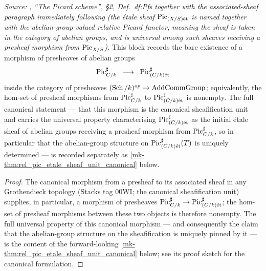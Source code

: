 \begin{theorem}\label{mk-thm:rel_pic_etale_sheaf_group_structure}
  \leanok

  \textit{Source: \cite{kleiman-picard}, ``The Picard scheme'', \S 2,
  Def.~df:Pfs together with the associated-sheaf paragraph immediately
  following (the \'etale sheaf \(\operatorname{Pic}_{(X/S)\mathrm{\acute{e}t}}\) is named together with the
  abelian-group-valued relative Picard functor, meaning the sheaf is taken in
  the category of abelian groups, and is universal among such sheaves
  receiving a presheaf morphism from \(\operatorname{Pic}_{X/S}\)).}
  This block records the bare existence of a morphism of presheaves of
  abelian groups
  \[
    \operatorname{Pic}^\sharp_{C/k} \;\;\longrightarrow\;\;
    \operatorname{Pic}^\sharp_{(C/k)\mathrm{\acute{e}t}}
  \]
  inside the category of presheaves
  \((\operatorname{Sch}/k)^{op} \to \mathrm{AddCommGroup}\); equivalently, the hom-set of
  presheaf morphisms from \(\operatorname{Pic}^\sharp_{C/k}\) to
  \(\operatorname{Pic}^\sharp_{(C/k)\mathrm{\acute{e}t}}\) is nonempty. The full canonical statement
  --- that this morphism is the canonical sheafification unit and
  carries the universal property characterising
  \(\operatorname{Pic}^\sharp_{(C/k)\mathrm{\acute{e}t}}\) as the initial \'etale sheaf of abelian
  groups receiving a presheaf morphism from \(\operatorname{Pic}^\sharp_{C/k}\), so
  in particular that the abelian-group structure on
  \(\operatorname{Pic}^\sharp_{(C/k)\mathrm{\acute{e}t}}(T)\) is uniquely determined --- is recorded
  separately as \ref{mk-thm:rel_pic_etale_sheaf_unit_canonical} below.
\end{theorem}
\begin{proof}
  \leanok


The canonical morphism from a presheaf to its associated sheaf in
  any Grothendieck topology (Stacks tag 00WI; the canonical
  sheafification unit) supplies, in particular, a morphism of
  presheaves \(\operatorname{Pic}^\sharp_{C/k} \to \operatorname{Pic}^\sharp_{(C/k)\mathrm{\acute{e}t}}\); the
  hom-set of presheaf morphisms between these two objects is therefore
  nonempty. The full universal property of this canonical morphism
  --- and consequently the claim that the abelian-group structure on
  the sheafification is uniquely pinned by it --- is the content of
  the forward-looking \ref{mk-thm:rel_pic_etale_sheaf_unit_canonical}
  below; see its proof sketch for the canonical formulation.
\end{proof}

